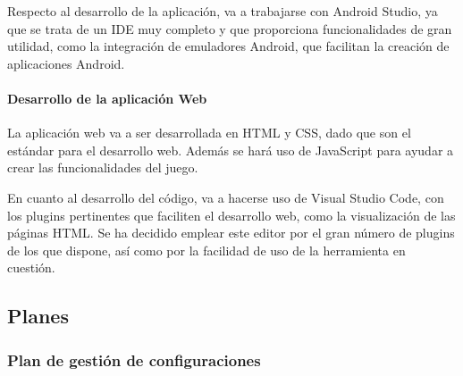 \documentclass{article}
\begin{document}
Respecto al desarrollo de la aplicación, va a trabajarse con Android Studio, ya que se trata de un IDE muy completo y que proporciona funcionalidades de gran utilidad, como la integración de emuladores Android, que facilitan la creación de aplicaciones Android.

\paragraph*{Desarrollo de la aplicación Web}
La aplicación web va a ser desarrollada en HTML y CSS, dado que son el estándar para el desarrollo web. Además se hará uso de JavaScript para ayudar a crear las funcionalidades del juego.

En cuanto al desarrollo del código, va a hacerse uso de Visual Studio Code, con los plugins pertinentes que faciliten el desarrollo web, como la visualización de las páginas HTML. Se ha decidido emplear este editor por el gran número de plugins de los que dispone, así como por la facilidad de uso de la herramienta en cuestión.

\subsection{Planes}

\subsubsection{Plan de gestión de configuraciones}




\end{document}
